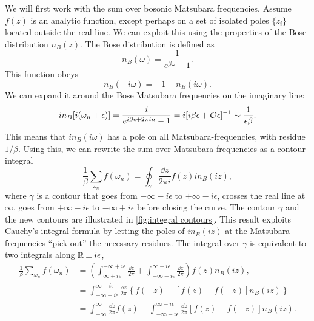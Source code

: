 We will first work with the sum over bosonic Matsubara frequencies.
Assume $f(z)$ is an analytic function, except perhaps on a set of isolated poles $\{z_i\}$ located outside the real line.
We can exploit this using the properties of the Bose-distribution $n_B(z)$.
The Bose distribution is defined as 
\begin{equation}
    n_B(\omega) = \frac{1}{e^{\beta \omega} - 1}.
\end{equation}
This function obeys
\begin{equation}
    n_B(- i \omega) = -1 - n_B(i \omega).
\end{equation}
We can expand it around the Bose Matsubara frequencies on the imaginary line:
\begin{equation}
    i n_B[i (\omega_n + \epsilon)] = \frac{i}{e^{i\beta \epsilon + 2 \pi i n} - 1}
    = i [i\beta \epsilon + \mathcal O{\epsilon} ]^{-1} \sim  \frac{1}{\epsilon \beta}.
\end{equation}
This means that $in_B(i\omega)$ has a pole on all Matsubara-frequencies, with residue $1/\beta$.
Using this, we can rewrite the sum over Matsubara frequencies as a contour integral
\begin{equation*}
    \frac{1}{\beta} \sum_{\omega_n} f(\omega_n) 
    = \oint_\gamma \frac{\dd z}{2 \pi i} f(z) i n_B(i z),
\end{equation*}
where $\gamma$ is a contour that goes from $- \infty - i \epsilon$ to $+ \infty - i \epsilon$, crosses the real line at $\infty$, goes from $+ \infty - i \epsilon$ to $- \infty + i \epsilon$ before closing the curve.
The contour $\gamma$ and the new contours are illustrated in \autoref{fig:integral contours}.
This result exploits Cauchy's integral formula by letting the poles of $in_B(iz)$ at the Matsubara frequencies ``pick out'' the necessary residues.
The integral over $\gamma$ is equivalent to two integrals along $\mathbb{R} \pm i \epsilon$,
\begin{align}
    \nonumber
    \frac{1}{\beta} \sum_{\omega_n} f(\omega_n) 
    &= \left(
        \int_{\infty + i \epsilon}^{-\infty + i \epsilon} \frac{\dd z}{2 \pi} 
        + \int_{-\infty - i \epsilon}^{\infty - i \epsilon}\frac{\dd z}{2 \pi}
    \right) 
    f(z) n_B(i z),
    \\
    \nonumber
    & = \int_{-\infty - i \epsilon}^{\infty - i \epsilon}\frac{\dd z}{2 \pi}
    \left\{
        f(-z) + \left[f(z) + f(-z)\right] n_B(iz)
    \right\} 
    \\
    \label{bosonic sum to integral}
    & = \int_{-\infty}^{\infty} \frac{\dd z}{2 \pi} f(z)
    +
    \int_{-\infty - i \epsilon}^{\infty - i \epsilon}\frac{\dd z}{2 \pi}
    \left[
        f(z) - f(-z)
    \right]
    n_B(iz).
\end{align}

